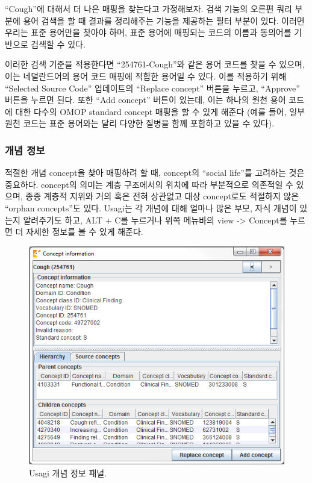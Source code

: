 \documentclass[10.5pt]{book}
\theoremstyle{definition}
\theoremstyle{definition}
\theoremstyle{definition}
\theoremstyle{remark}
\begin{document}
``Cough''에 대해서 더 나은 매핑을 찾는다고 가정해보자. 검색 기능의
오른편 쿼리 부분에 용어 검색을 할 때 결과를 정리해주는 기능을 제공하는
필터 부분이 있다. 이러면 우리는 표준 용어만을 찾아야 하며, 표준 용어에
매핑되는 코드의 이름과 동의어를 기반으로 검색할 수 있다.

이러한 검색 기준을 적용한다면 ``254761-Cough''와 같은 용어 코드를 찾을
수 있으며, 이는 네덜란드어의 용어 코드 매핑에 적합한 용어일 수 있다.
이를 적용하기 위해 ``Selected Source Code'' 업데이트의 ``Replace
concept'' 버튼을 누르고, ``Approve'' 버튼을 누르면 된다. 또한 ``Add
concept'' 버튼이 있는데, 이는 하나의 원천 용어 코드에 대한 다수의 OMOP
standard concept 매핑을 할 수 있게 해준다 (예를 들어, 일부 원천 코드는
표준 용어와는 달리 다양한 질병을 함께 포함하고 있을 수 있다).

\subsubsection*{개념 정보}\label{-}

적절한 개념 concept을 찾아 매핑하려 할 때, concept의 ``social life''를
고려하는 것은 중요하다. concept의 의미는 계층 구조에서의 위치에 따라
부분적으로 의존적일 수 있으며, 종종 계층적 지위와 거의 혹은 전혀
상관없고 대상 concept로도 적절하지 않은 ``orphan concepts''도 있다.
Usagi는 각 개념에 대해 얼마나 많은 부모, 자식 개념이 있는지 알려주기도
하고, ALT + C를 누르거나 위쪽 메뉴바의 view -\textgreater{} Concept를
누르면 더 자세한 정보를 볼 수 있게 해준다.

\begin{figure}

{\centering \includegraphics[width=1\linewidth]{images/ExtractTransformLoad/usagiConceptInfo} 

}

\caption{Usagi 개념 정보 패널.}\label{fig:usagiConceptInfo}
\end{figure}
\end{document}
